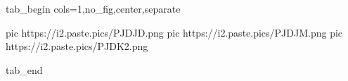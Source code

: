  
 
 
 
 


\ifcmt
  tab_begin cols=1,no_fig,center,separate

     pic https://i2.paste.pics/PJDJD.png
		 pic https://i2.paste.pics/PJDJM.png
		 pic https://i2.paste.pics/PJDK2.png

  tab_end
\fi
